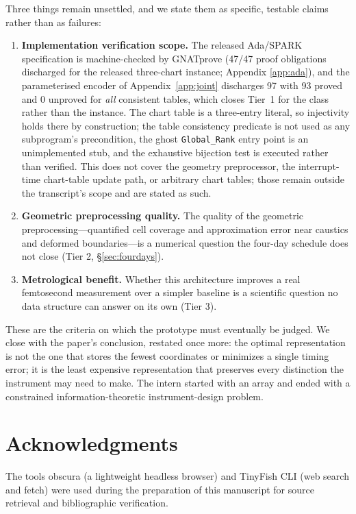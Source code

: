 \documentclass[11pt]{article}
\begin{document}
Three things remain unsettled, and we state them as specific, testable claims rather than
as failures:
\begin{enumerate}[label=(\arabic*)]
\item \textbf{Implementation verification scope.} The released Ada/SPARK
specification is machine-checked by GNATprove (47/47 proof obligations discharged for
the released three-chart instance; Appendix \ref{app:ada}), and the parameterised encoder
of Appendix~\ref{app:joint} discharges 97 with 93 proved and 0 unproved for \emph{all}
consistent tables, which closes Tier~1 for the class rather than the instance. The chart
table is a three-entry literal, so injectivity holds there by construction; the table
consistency predicate is not used as any subprogram's precondition, the ghost
\texttt{Global\_Rank} entry point is an unimplemented stub, and the exhaustive bijection
test is executed rather than verified. This does not cover the geometry preprocessor,
the interrupt-time chart-table update path, or arbitrary chart tables; those remain
outside the transcript's scope and are stated as such.
\item \textbf{Geometric preprocessing quality.} The quality of the geometric
preprocessing---quantified cell coverage and approximation error near caustics and
deformed boundaries---is a numerical question the four-day schedule does not close
(Tier 2, \S\ref{sec:fourdays}).
\item \textbf{Metrological benefit.} Whether this architecture improves a real
femtosecond measurement over a simpler baseline is a scientific question no data
structure can answer on its own (Tier 3).
\end{enumerate}

These are the criteria on which the prototype must eventually be judged. We close with
the paper's conclusion, restated once more: the optimal representation is not the one
that stores the fewest coordinates or minimizes a single timing error; it is the least
expensive representation that preserves every distinction the instrument may need to
make. The intern started with an array and ended with a constrained
information-theoretic instrument-design problem.

\section*{Acknowledgments}
The tools obscura (a lightweight headless browser) and TinyFish CLI (web search and
fetch) were used during the preparation of this manuscript for source retrieval and
bibliographic verification.
\end{document}
